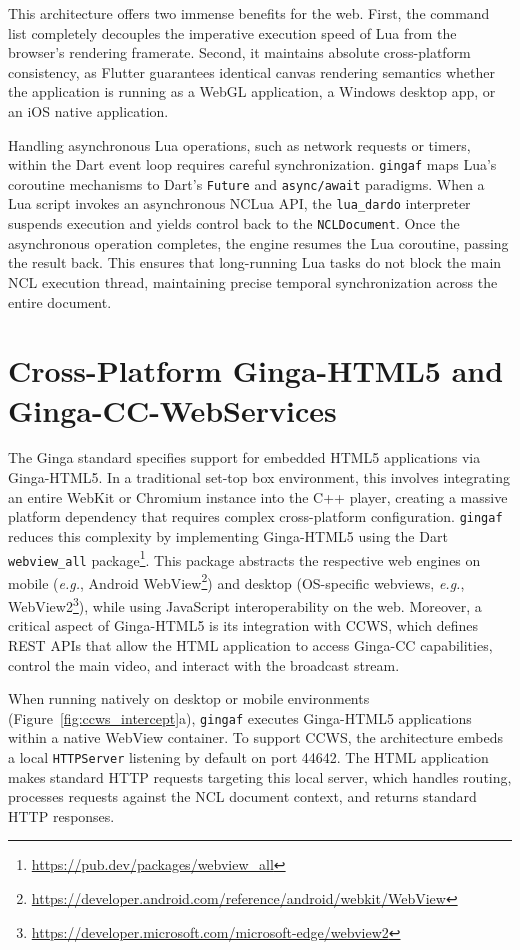 \documentclass[sigconf,authorversion,review,authordraft]{webmedia}
\newcommand{\projectname}{\texttt{gingaf}}
\begin{document}
This architecture offers two immense benefits for the web. First, the command list completely decouples the imperative execution speed of Lua from the browser's rendering framerate. Second, it maintains absolute cross-platform consistency, as Flutter guarantees identical canvas rendering semantics whether the application is running as a WebGL application, a Windows desktop app, or an iOS native application.

Handling asynchronous Lua operations, such as network requests or timers, within the Dart event loop requires careful synchronization. \projectname{} maps Lua's coroutine mechanisms to Dart's \texttt{Future} and \texttt{async/await} paradigms. When a Lua script invokes an asynchronous NCLua API, the \texttt{lua\_dardo} interpreter suspends execution and yields control back to the \texttt{NCLDocument}. Once the asynchronous operation completes, the engine resumes the Lua coroutine, passing the result back. This ensures that long-running Lua tasks do not block the main NCL execution thread, maintaining precise temporal synchronization across the entire document.

\section{Cross-Platform Ginga-HTML5 and Ginga-CC-WebServices}
\label{sec:htmlccws}

The Ginga standard specifies support for embedded HTML5 applications via Ginga-HTML5. In a traditional set-top box environment, this involves integrating an entire WebKit or Chromium instance into the C++ player, creating a massive platform dependency that requires complex cross-platform configuration. \projectname{} reduces this complexity by implementing Ginga-HTML5 using the Dart \texttt{webview\_all} package\footnote{\url{https://pub.dev/packages/webview_all}}. This package abstracts the respective web engines on mobile (\textit{e.g.}, Android WebView\footnote{\url{https://developer.android.com/reference/android/webkit/WebView}}) and desktop (OS-specific webviews, \textit{e.g.}, WebView2\footnote{\url{https://developer.microsoft.com/microsoft-edge/webview2}}), while using JavaScript interoperability on the web. Moreover, a critical aspect of Ginga-HTML5 is its integration with CCWS, which defines REST APIs that allow the HTML application to access Ginga-CC capabilities, control the main video, and interact with the broadcast stream.

When running natively on desktop or mobile environments (Figure~\ref{fig:ccws_intercept}a), \projectname{} executes Ginga-HTML5 applications within a native WebView container. To support CCWS, the architecture embeds a local \texttt{HTTPServer} listening by default on port 44642. The HTML application makes standard HTTP requests targeting this local server, which handles routing, processes requests against the NCL document context, and returns standard HTTP responses.
\end{document}
